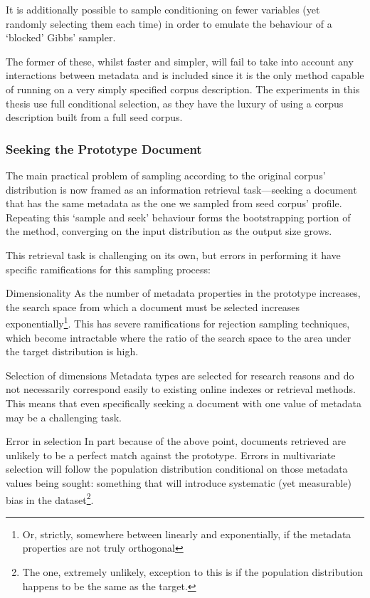 
It is additionally possible to sample conditioning on fewer variables (yet randomly selecting them each time) in order to emulate the behaviour of a `blocked' Gibbs' sampler.

The former of these, whilst faster and simpler, will fail to take into account any interactions between metadata and is included since it is the only method capable of running on a very simply specified corpus description.  The experiments in this thesis use full conditional selection, as they have the luxury of using a corpus description built from a full seed corpus.


\subsubsection{Seeking the Prototype Document}
\label{sec:rebuilding:design:seekprototype}
The main practical problem of sampling according to the original corpus' distribution is now framed as an information retrieval task---seeking a document that has the same metadata as the one we sampled from seed corpus' profile.  Repeating this `sample and seek' behaviour forms the bootstrapping portion of the method, converging on the input distribution as the output size grows.

This retrieval task is challenging on its own, but errors in performing it have specific ramifications for this sampling process:

\begin{itemizeTitle}
    \item[Dimensionality]As the number of metadata properties in the prototype increases, the search space from which a document must be selected increases exponentially\footnote{Or, strictly, somewhere between linearly and exponentially, if the metadata properties are not truly orthogonal}.  This has severe ramifications for rejection sampling techniques, which become intractable where the ratio of the search space to the area under the target distribution is high.

    \item[Selection of dimensions]Metadata types are selected for research reasons and do not necessarily correspond easily to existing online indexes or retrieval methods.  This means that even specifically seeking a document with one value of metadata may be a challenging task.

    \item[Error in selection]In part because of the above point, documents retrieved are unlikely to be a perfect match against the prototype.  Errors in multivariate selection will follow the population distribution conditional on those metadata values being sought: something that will introduce systematic (yet measurable) bias in the dataset\footnote{The one, extremely unlikely, exception to this is if the population distribution happens to be the same as the target.}.
\end{itemizeTitle}


